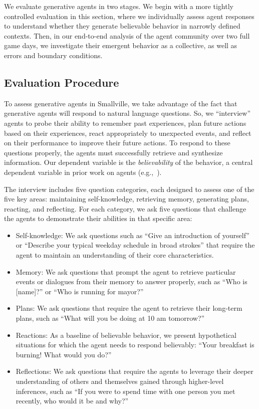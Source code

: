 We evaluate generative agents in two stages. We begin with a more tightly controlled evaluation in this section, where we individually assess agent responses to understand whether they generate believable behavior in narrowly defined contexts. Then, in our end-to-end analysis of the agent community over two full game days, we investigate their emergent behavior as a collective, as well as errors and boundary conditions.

\subsection{Evaluation Procedure} To assess generative agents in Smallville, we take advantage of the fact that generative agents will respond to natural language questions. So, we ``interview'' agents to probe their ability to remember past experiences, plan future actions based on their experiences, react appropriately to unexpected events, and reflect on their performance to improve their future actions. To respond to these questions properly, the agents must successfully retrieve and synthesize information. Our dependent variable is the \textit{believability} of the behavior, a central dependent variable in prior work on agents (e.g.,~\cite{22_bates1994role}). 

The interview includes five question categories, each designed to assess one of the five key areas: maintaining self-knowledge, retrieving memory, generating plans, reacting, and reflecting. For each category, we ask five questions that challenge the agents to demonstrate their abilities in that specific area:

\begin{itemize}
\item Self-knowledge: We ask questions such as “Give an introduction of yourself” or “Describe your typical weekday schedule in broad strokes” that require the agent to maintain an understanding of their core characteristics.
\item Memory: We ask questions that prompt the agent to retrieve particular events or dialogues from their memory to answer properly, such as “Who is [name]?” or “Who is running for mayor?”
\item Plans: We ask questions that require the agent to retrieve their long-term plans, such as “What will you be doing at 10 am tomorrow?” 
\item Reactions: As a baseline of believable behavior, we present hypothetical situations for which the agent needs to respond believably: “Your breakfast is burning! What would you do?”
\item Reflections: We ask questions that require the agents to leverage their deeper understanding of others and themselves gained through higher-level inferences, such as “If you were to spend time with one person you met recently, who would it be and why?”
\end{itemize}

